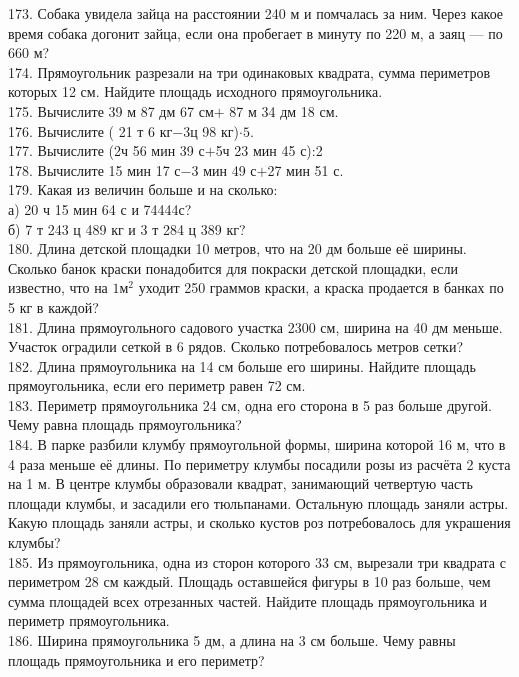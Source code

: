 \documentclass[12pt]{article}
\begin{document}
173. Собака увидела зайца на расстоянии 240 м и помчалась за ним. Через какое время собака догонит зайца, если она пробегает в минуту по 220 м, а заяц --- по 660 м?\\
174. Прямоугольник разрезали на три одинаковых квадрата, сумма периметров которых 12 см. Найдите площадь исходного прямоугольника.\\
175. Вычислите 39 м 87 дм 67 см$+$ 87 м 34 дм 18 см.\\
176. Вычислите ( 21 т 6 кг$-$3ц 98 кг)$\cdot5.$\\
177. Вычислите (2ч 56 мин 39 с$+$5ч 23 мин 45 с):2\\
178. Вычислите 15 мин 17 с$-$3 мин 49 с$+$27 мин 51 с.\\
179. Какая из величин больше и на сколько:\\
а) 20 ч 15 мин 64 с и 74444с?\\
б) 7 т 243 ц 489 кг и 3 т 284 ц 389 кг?\\
180. Длина детской площадки 10 метров, что на 20 дм больше её ширины. Сколько банок краски понадобится для покраски детской площадки, если известно, что на $1\text{м}^2$ уходит 250 граммов краски, а краска продается в банках по 5 кг в каждой?\\
181. Длина прямоугольного садового участка 2300 см, ширина на 40 дм меньше. Участок оградили сеткой в 6 рядов. Сколько потребовалось метров сетки?\\
182. Длина прямоугольника на 14 см больше его ширины. Найдите площадь прямоугольника, если его периметр равен 72 см.\\
183. Периметр прямоугольника 24 см, одна его сторона в 5 раз больше другой. Чему равна площадь прямоугольника?\\
184. В парке разбили клумбу прямоугольной формы, ширина которой 16 м, что в 4 раза меньше её длины. По периметру клумбы посадили розы из  расчёта 2 куста на 1 м. В центре клумбы образовали квадрат, занимающий четвертую часть площади клумбы, и засадили его тюльпанами. Остальную площадь заняли астры. Какую площадь заняли астры, и сколько кустов роз потребовалось для украшения клумбы?\\
185. Из прямоугольника, одна из сторон которого 33 см, вырезали три квадрата с периметром 28 см каждый. Площадь оставшейся фигуры в 10 раз больше, чем сумма площадей всех отрезанных частей. Найдите площадь прямоугольника и периметр прямоугольника.\\
186. Ширина прямоугольника 5 дм, а длина на 3 см больше. Чему равны площадь прямоугольника и его периметр?\\
\end{document}
